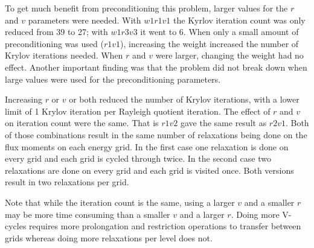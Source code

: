 To get much benefit from preconditioning this problem, larger values for the $r$ and $v$ parameters were needed. With $w1r1v1$ the Kyrlov iteration count was only reduced from 39 to 27; with $w1r3v3$ it went to 6. When only a small amount of preconditioning was used ($r1v1$), increasing the weight increased the number of Krylov iterations needed. When $r$ and $v$ were larger, changing the weight had no effect. Another important finding was that the problem did not break down when large values were used for the preconditioning parameters. 

Increasing $r$ or $v$ or both reduced the number of Krylov iterations, with a lower limit of 1 Krylov iteration per Rayleigh quotient iteration. The effect of $r$ and $v$ on iteration count were the same. That is $r1v2$ gave the same result as $r2v1$. Both of those combinations result in the same number of relaxations being done on the flux moments on each energy grid. In the first case one relaxation is done on every grid and each grid is cycled through twice. In the second case two relaxations are done on every grid and each grid is visited once. Both versions result in two relaxations per grid. 

Note that while the iteration count is the same, using a larger $v$ and a smaller $r$ may be more time consuming than a smaller $v$ and a larger $r$. Doing more V-cycles requires more prolongation and restriction operations to transfer between grids whereas doing more relaxations per level does not. 

